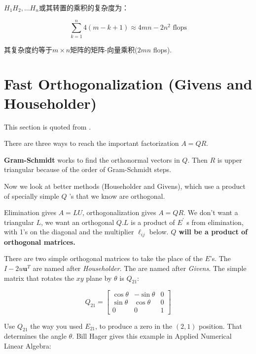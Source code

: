 $H_{1} H_{2}, \ldots H_{n} $或其转置的乘积的复杂度为： 

$$ \sum_{k=1}^{n} 4(m-k+1) \approx 4 m n-2 n^{2}  \text{ flops}$$

其复杂度约等于$m \times n$矩阵的矩阵-向量乘积($2mn$ flops). 


\section{Fast Orthogonalization (Givens and Householder)}

\begin{remark}
    This section is quoted from \cite{Strang1993IntroductionTL}.
\end{remark}

There are three ways to reach the important factorization $A=Q R$. 

\textbf{Gram-Schmidt} works to find the orthonormal vectors in $Q .$ Then $R$ is upper triangular because of the order of Gram-Schmidt steps. 

Now we look at better methods (Householder and Givens), which use a product of specially simple $Q$ 's that we know are orthogonal.

Elimination gives $A=L U$, orthogonalization gives $A=Q R$. We don't want a triangular $L$, we want an orthogonal $Q . L$ is a product of $E^{\prime}$ s from elimination, with 1's on the diagonal and the multiplier $\ell_{i j}$ below. \textbf{$Q$ will be a product of orthogonal matrices.}

There are two simple orthogonal matrices to take the place of the $E$'s. The  $I-2 u \boldsymbol{u}^{ {T}}$ are named after \textit{Householder}. The  are named after \textit{Givens}. The simple matrix that rotates the $x y$ plane by $\theta$ is $Q_{21}$:  

\begin{definition}
    $$Q_{21}=\left[\begin{array}{crc}
        \cos \theta & -\sin \theta & 0 \\
        \sin \theta & \cos \theta & 0 \\
        0 & 0 & 1
        \end{array}\right]$$
\end{definition}

Use $Q_{21}$ the way you used $E_{21}$, to produce a zero in the $(2,1)$ position. That determines the angle $\theta$. Bill Hager gives this example in Applied Numerical Linear Algebra:

